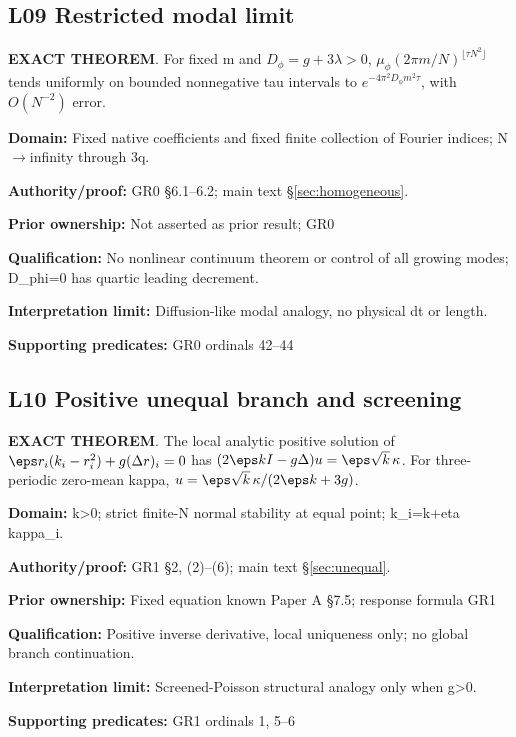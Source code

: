 \par\noindent\begin{minipage}{\linewidth}
\subsection*{L09 Restricted modal limit}
\textbf{EXACT THEOREM}. For fixed m and \(D_\phi=g+3\lambda>0\), \(\mu_\phi(2\pi m/N)^{\lfloor\tau N^2\rfloor}\) tends uniformly on bounded nonnegative tau intervals to \(e^{-4\pi^2D_\phi m^2\tau}\), with \(O(N^{-2})\) error.\par
\textbf{Domain:} Fixed native coefficients and fixed finite collection of Fourier indices; N$\to$infinity through 3q.\par
\textbf{Authority/proof:} GR0 \S{}6.1--6.2; main text \S\ref{sec:homogeneous}.\par
\textbf{Prior ownership:} Not asserted as prior result; GR0\par
\textbf{Qualification:} No nonlinear continuum theorem or control of all growing modes; D\_phi=0 has quartic leading decrement.\par
\textbf{Interpretation limit:} Diffusion-like modal analogy, no physical dt or length.\par
\textbf{Supporting predicates:} GR0 ordinals 42--44\par
\end{minipage}\par\medskip
\par\noindent\begin{minipage}{\linewidth}
\subsection*{L10 Positive unequal branch and screening}
\textbf{EXACT THEOREM}. The local analytic positive solution of \(\eps r_i(k_i-r_i^2)+g(\Delta r)_i=0\) has \((2\eps kI-g\Delta)u=\eps\sqrt{k}\,\kappa\). For three-periodic zero-mean kappa, \(u=\eps\sqrt{k}\,\kappa/(2\eps k+3g)\).\par
\textbf{Domain:} k>0; strict finite-N normal stability at equal point; k\_i=k+eta kappa\_i.\par
\textbf{Authority/proof:} GR1 \S{}2, (2)--(6); main text \S\ref{sec:unequal}.\par
\textbf{Prior ownership:} Fixed equation known Paper A \S{}7.5; response formula GR1\par
\textbf{Qualification:} Positive inverse derivative, local uniqueness only; no global branch continuation.\par
\textbf{Interpretation limit:} Screened-Poisson structural analogy only when g>0.\par
\textbf{Supporting predicates:} GR1 ordinals 1, 5--6\par
\end{minipage}\par\medskip

